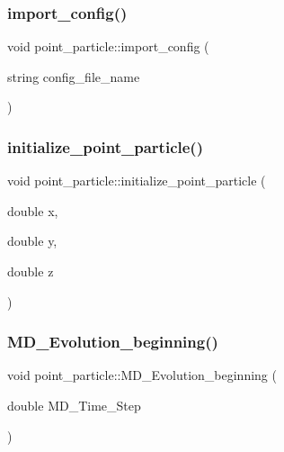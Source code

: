 \mbox{\label{classpoint__particle_a40db3a07bcbe9888fc538a469f8b0708}} 
\subsubsection{\texorpdfstring{import\_config()}{import\_config()}}
{\footnotesize\ttfamily void point\+\_\+particle\+::import\+\_\+config (\begin{DoxyParamCaption}\item[{string}]{config\+\_\+file\+\_\+name }\end{DoxyParamCaption})}

\mbox{\label{classpoint__particle_a8019c456768e1fbe70d56bd3821b2906}} 
\subsubsection{\texorpdfstring{initialize\_point\_particle()}{initialize\_point\_particle()}}
{\footnotesize\ttfamily void point\+\_\+particle\+::initialize\+\_\+point\+\_\+particle (\begin{DoxyParamCaption}\item[{double}]{x,  }\item[{double}]{y,  }\item[{double}]{z }\end{DoxyParamCaption})}

\mbox{\label{classpoint__particle_a2dae1b70a2fbfdf4f95abeb086e90d23}} 
\subsubsection{\texorpdfstring{MD\_Evolution\_beginning()}{MD\_Evolution\_beginning()}}
{\footnotesize\ttfamily void point\+\_\+particle\+::\+M\+D\+\_\+\+Evolution\+\_\+beginning (\begin{DoxyParamCaption}\item[{double}]{M\+D\+\_\+\+Time\+\_\+\+Step }\end{DoxyParamCaption})}

